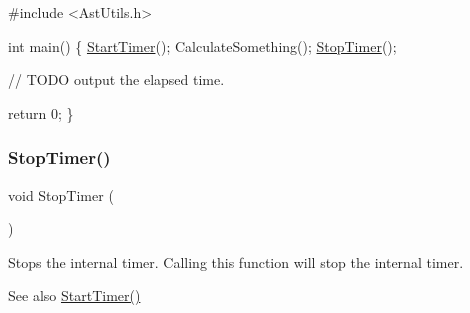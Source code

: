 \begin{DoxyCode}
\textcolor{preprocessor}{#include <AstUtils.h>}

\textcolor{keywordtype}{int} main()
\{
  \hyperlink{group__timer__group_ga66509b494102a5c28ba6c8be3eab7733}{StartTimer}();
  CalculateSomething();
  \hyperlink{group__timer__group_gaf3619f34a9bc0184b4578e5337069856}{StopTimer}();

  \textcolor{comment}{// TODO output the elapsed time.}

  \textcolor{keywordflow}{return} 0;
\}
\end{DoxyCode}
 \mbox{\label{group__timer__group_gaf3619f34a9bc0184b4578e5337069856}} 
\subsubsection{\texorpdfstring{Stop\+Timer()}{StopTimer()}}
{\footnotesize\ttfamily void Stop\+Timer (\begin{DoxyParamCaption}{ }\end{DoxyParamCaption})}

Stops the internal timer. Calling this function will stop the internal timer.

\begin{DoxySeeAlso}{See also}
\hyperlink{group__timer__group_ga66509b494102a5c28ba6c8be3eab7733}{Start\+Timer()} 
\end{DoxySeeAlso}

